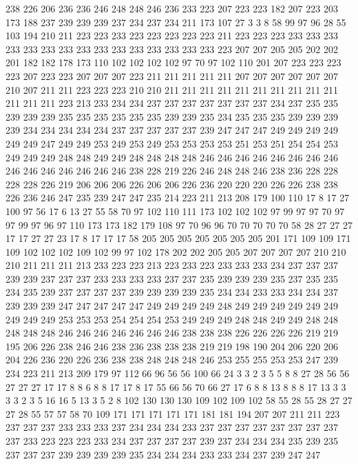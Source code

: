 238 226 206 236 236 246 248 248 246 236 233 223 207 223 223 182 207 223 203 173
188 237 239 239 239 237 234 237 234 211 173 107 27 3 3 8 58 99 97 96
28 55 103 194 210 211 223 223 233 223 223 223 223 223 211 223 223 223 233 233
233 233 233 233 233 233 233 233 233 233 233 233 233 223 207 207 205 205 202 202
201 182 182 178 173 110 102 102 102 102 97 70 97 102 110 201 207 223 223 223
223 207 223 223 207 207 207 223 211 211 211 211 211 207 207 207 207 207 207 210
207 211 211 223 223 223 210 210 211 211 211 211 211 211 211 211 211 211 211 211
211 223 213 233 234 234 237 237 237 237 237 237 237 234 237 235 235 239 239 239
235 235 235 235 235 235 239 239 235 234 235 235 235 239 239 239 239 234 234 234
234 234 237 237 237 237 237 239 247 247 247 249 249 249 249 249 249 247 249 249
253 249 253 249 253 253 253 253 251 253 251 254 254 253 249 249 249 248 248 249
249 248 248 248 248 246 246 246 246 246 246 246 246 246 246 246 246 246 246 246
238 228 219 226 246 248 248 246 238 236 228 228 228 228 226 219 206 206 206 226
206 206 226 236 220 220 220 226 226 238 238 226 236 246 247 235 239 247 247 235
214 223 211 213 208 179 100 110 17 8 17 27 100 97 56 17 6 13 27 55
58 70 97 102 110 111 173 102 102 102 97 99 97 97 70 97 97 99 97 96
97 110 173 173 182 179 108 97 70 96 96 70 70 70 70 70 58 28 27 27
27 17 17 27 27 23 17 8 17 17 17 58 205 205 205 205 205 205 205 201
171 109 109 171 109 102 102 102 109 102 99 97 102 178 202 202 205 205 207 207
207 207 210 210 210 211 211 211 213 233 223 223 213 223 233 223 233 233 233 234
237 237 237 239 239 237 237 237 233 233 233 233 237 237 235 239 239 239 235 237
235 235 234 235 239 237 237 237 237 239 239 239 239 235 234 234 233 233 234 234
237 239 239 239 247 247 247 247 247 249 249 249 249 248 249 249 249 249 249 249
249 249 249 253 253 253 254 254 254 253 249 249 249 248 248 249 249 248 248 248
248 248 246 246 246 246 246 246 246 238 238 238 226 226 226 226 219 219 195 206
226 238 246 246 238 236 238 238 238 219 219 198 190 204 206 220 206 204 226 236
220 226 236 238 238 248 248 248 246 253 255 255 253 253 247 239 234 223 211 213
209 179 97 112 66 96 56 56 100 66 24 3 3 2 3 5 5 8 8 27
28 56 56 27 27 27 17 17 8 8 6 8 8 17 17 8 17 55 66 56
70 66 27 17 6 8 8 13 8 8 8 17 13 3 3 3 3 2 3 5
16 16 5 13 3 5 2 8 102 130 130 130 109 102 109 102 58 55 28 55
28 27 27 27 28 55 57 57 58 70 109 171 171 171 171 171 181 181 194 207
207 211 211 223 237 237 237 233 233 233 237 234 234 234 233 237 237 237 237 237
237 237 237 237 233 223 223 223 233 234 237 237 237 237 239 237 234 234 234 235
239 235 237 237 237 239 239 239 239 235 234 234 234 233 233 234 237 239 247 247

